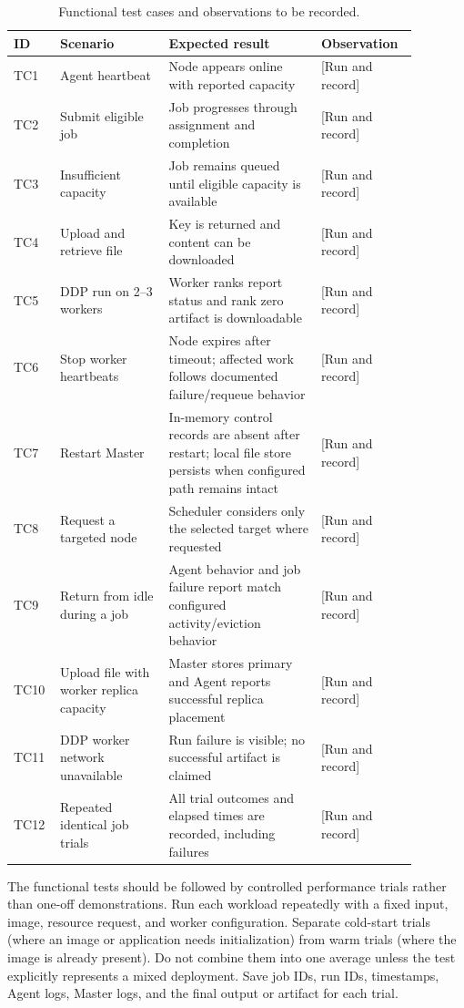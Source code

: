 \documentclass{article}
\begin{document}
\begin{table}[h!]
\centering
\caption{Functional test cases and observations to be recorded.}
\label{tab:testcases}
\begin{tabular}{|p{0.08\linewidth}|p{0.25\linewidth}|p{0.35\linewidth}|p{0.2\linewidth}|}
\hline
ID & Scenario & Expected result & Observation \\
\hline
TC1 & Agent heartbeat & Node appears online with reported capacity & [Run and record] \\
\hline
TC2 & Submit eligible job & Job progresses through assignment and completion & [Run and record] \\
\hline
TC3 & Insufficient capacity & Job remains queued until eligible capacity is available & [Run and record] \\
\hline
TC4 & Upload and retrieve file & Key is returned and content can be downloaded & [Run and record] \\
\hline
TC5 & DDP run on 2--3 workers & Worker ranks report status and rank zero artifact is downloadable & [Run and record] \\
\hline
TC6 & Stop worker heartbeats & Node expires after timeout; affected work follows documented failure/requeue behavior & [Run and record] \\
\hline
TC7 & Restart Master & In-memory control records are absent after restart; local file store persists when configured path remains intact & [Run and record] \\
\hline
TC8 & Request a targeted node & Scheduler considers only the selected target where requested & [Run and record] \\
\hline
TC9 & Return from idle during a job & Agent behavior and job failure report match configured activity/eviction behavior & [Run and record] \\
\hline
TC10 & Upload file with worker replica capacity & Master stores primary and Agent reports successful replica placement & [Run and record] \\
\hline
TC11 & DDP worker network unavailable & Run failure is visible; no successful artifact is claimed & [Run and record] \\
\hline
TC12 & Repeated identical job trials & All trial outcomes and elapsed times are recorded, including failures & [Run and record] \\
\hline
\end{tabular}
\end{table}

The functional tests should be followed by controlled performance trials rather than one-off demonstrations. Run each workload repeatedly with a fixed input, image, resource request, and worker configuration. Separate cold-start trials (where an image or application needs initialization) from warm trials (where the image is already present). Do not combine them into one average unless the test explicitly represents a mixed deployment. Save job IDs, run IDs, timestamps, Agent logs, Master logs, and the final output or artifact for each trial.
\end{document}
